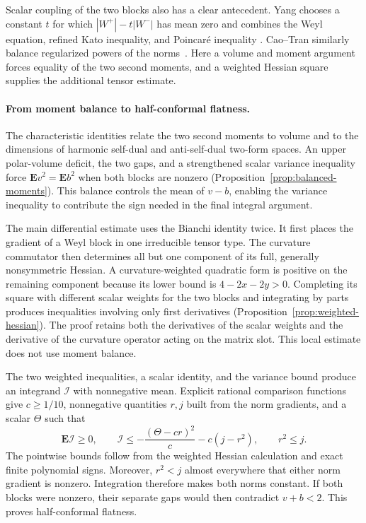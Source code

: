 Scalar coupling of the two blocks also has a clear antecedent. Yang
chooses a constant $t$ for which $|W^+|-t|W^-|$ has mean zero and combines
the Weyl equation, refined Kato inequality, and Poincar\'e inequality
\cite[\S6]{Yang2000}. Cao--Tran similarly balance regularized powers of
the norms~\cite[Proposition~2.2]{CaoTran2018}. Here a volume and moment
argument forces equality of the two second moments, and a weighted
Hessian square supplies the additional tensor estimate.

\paragraph{From moment balance to half-conformal flatness.}
The characteristic identities relate the two second moments to volume
and to the dimensions of harmonic self-dual and anti-self-dual two-form
spaces. An upper polar-volume deficit, the two gaps, and a strengthened
scalar variance inequality force
$\mathbf E v^2=\mathbf E b^2$ when both blocks are nonzero
(Proposition~\ref{prop:balanced-moments}). This balance controls the mean
of $v-b$, enabling the variance inequality to contribute the sign needed
in the final integral argument.

The main differential estimate uses the Bianchi identity twice. It first
places the gradient of a Weyl block in one irreducible tensor type.
The curvature commutator then determines all but one component of its
full, generally nonsymmetric Hessian. A curvature-weighted quadratic
form is positive on the remaining component because its lower bound is
$4-2x-2y>0$. Completing its square with different scalar weights for the
two blocks and integrating by parts produces inequalities involving only
first derivatives (Proposition~\ref{prop:weighted-hessian}). The proof
retains both the derivatives of the scalar weights and the derivative of
the curvature operator acting on the matrix slot. This local estimate
does not use moment balance.

The two weighted inequalities, a scalar identity, and the variance bound
produce an integrand $\mathcal I$ with nonnegative mean. Explicit rational
comparison functions give $c\ge1/10$, nonnegative quantities $r,j$ built
from the norm gradients, and a scalar $\Theta$ such that
\[
 \mathbf E\mathcal I\ge0,\qquad
 \mathcal I\le-\frac{(\Theta-cr)^2}{c}-c(j-r^2),
 \qquad r^2\le j.
\]
The pointwise bounds follow from the weighted Hessian calculation and
exact finite polynomial signs. Moreover, $r^2<j$ almost everywhere that
either norm gradient is nonzero. Integration therefore makes both norms
constant. If both blocks were nonzero, their separate gaps would then
contradict $v+b<2$. This proves half-conformal flatness.

